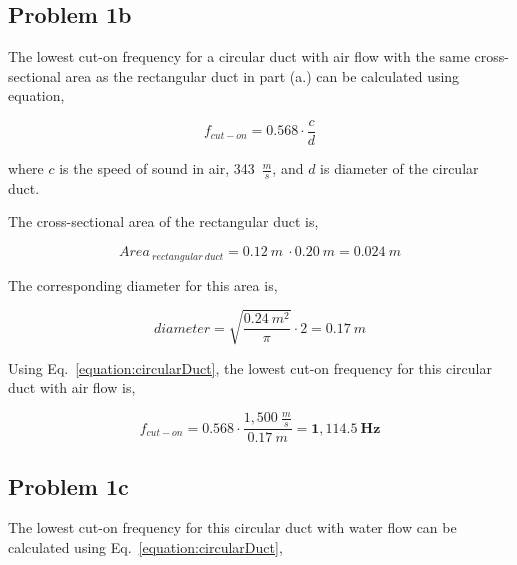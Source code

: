 \subsection*{Problem 1b}

The lowest cut-on frequency for a circular duct with air flow with the same cross-sectional area as the rectangular duct in part (a.) can be calculated using equation,

\vspace{-0.25cm}
\begin{equation}
    f_{cut-on} = 0.568 \cdot \frac{c}{d}
    \label{equation:circularDuct}
\end{equation}

where $c$ is the speed of sound in air, 343~$\frac{m}{s}$,  and $d$ is diameter of the circular duct.

\vspace{0.25cm}
The cross-sectional area of the rectangular duct is,

\vspace{-0.25cm}
\begin{equation*}
    Area_{~rectangular~duct} = 0.12~m~\cdot0.20~m =  0.024~m
\end{equation*}

\vspace{0.25cm}
The corresponding diameter for this area is,

\vspace{-0.25cm}
\begin{equation*}
    diameter = \sqrt{ \frac{0.24~m^2}{\pi} } \cdot 2 = 0.17~m
\end{equation*}

\vspace{0.25cm}
Using Eq.~\ref{equation:circularDuct}, the lowest cut-on frequency for this circular duct with air flow is,

\vspace{-0.25cm}
\begin{equation*}
    f_{cut-on} = 0.568 \cdot \frac{ 1,500~\frac{m}{s} }{ 0.17~m } = \boldsymbol{1,114.5~Hz}
\end{equation*}





\subsection*{Problem 1c}

The lowest cut-on frequency for this circular duct with water flow can be calculated using Eq.~\ref{equation:circularDuct},

